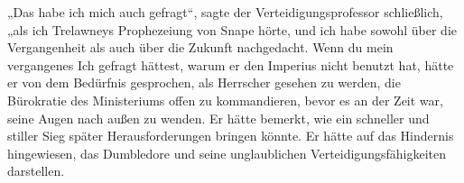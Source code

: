 „Das habe ich mich auch gefragt“, sagte der Verteidigungsprofessor schließlich, „als ich Trelawneys Prophezeiung von Snape hörte, und ich habe sowohl über die Vergangenheit als auch über die Zukunft nachgedacht. Wenn du mein vergangenes Ich gefragt hättest, warum er den Imperius nicht benutzt hat, hätte er von dem Bedürfnis gesprochen, als Herrscher gesehen zu werden, die Bürokratie des Ministeriums offen zu kommandieren, bevor es an der Zeit war, seine Augen nach außen zu wenden. Er hätte bemerkt, wie ein schneller und stiller Sieg später Herausforderungen bringen könnte. Er hätte auf das Hindernis hingewiesen, das Dumbledore und seine unglaublichen Verteidigungsfähigkeiten darstellen.

